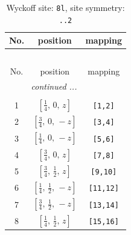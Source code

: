 \documentclass[fleqn,8pt]{jsarticle}
\begin{document}
\begin{longtable}{ccc}
\caption{Wyckoff site: {\tt 8l}, site symmetry: {\tt ..2}}
 \\
 \hline \hline
No. & position & mapping \\ \hline \endfirsthead

\multicolumn{2}{l}{\tablename\ \thetable{}} \\
 \hline \hline
No. & position & mapping \\ \hline \endhead

 \hline \hline
\multicolumn{2}{r}{\footnotesize\it continued ...} \\ \endfoot

 \hline \hline
\multicolumn{2}{r}{} \\ \endlastfoot

1 & $\left[ \frac{1}{4},\, 0,\, z \right]$ & {\tt [1,2]} \\ \hline
2 & $\left[ \frac{3}{4},\, 0,\, - z \right]$ & {\tt [3,4]} \\ \hline
3 & $\left[ \frac{1}{4},\, 0,\, - z \right]$ & {\tt [5,6]} \\ \hline
4 & $\left[ \frac{3}{4},\, 0,\, z \right]$ & {\tt [7,8]} \\ \hline
5 & $\left[ \frac{3}{4},\, \frac{1}{2},\, z \right]$ & {\tt [9,10]} \\ \hline
6 & $\left[ \frac{1}{4},\, \frac{1}{2},\, - z \right]$ & {\tt [11,12]} \\ \hline
7 & $\left[ \frac{3}{4},\, \frac{1}{2},\, - z \right]$ & {\tt [13,14]} \\ \hline
8 & $\left[ \frac{1}{4},\, \frac{1}{2},\, z \right]$ & {\tt [15,16]} \\
\end{longtable}
\renewcommand{\arraystretch}{1.2}
\end{document}

